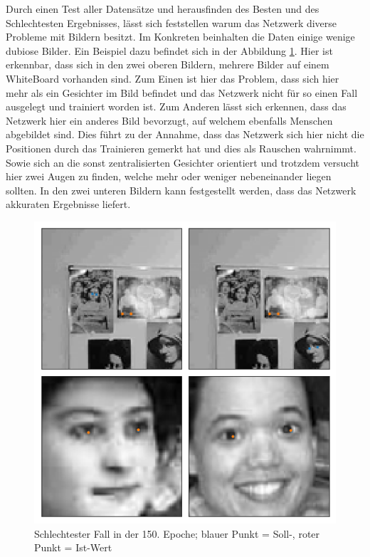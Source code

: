 \noindent
Durch einen Test aller Datensätze und herausfinden des Besten und des Schlechtesten Ergebnisses, lässt sich feststellen warum das Netzwerk diverse Probleme mit Bildern besitzt. 
Im Konkreten beinhalten die Daten einige wenige dubiose Bilder. 
Ein Beispiel dazu befindet sich in der Abbildung \ref{fig:dubio}. 
Hier ist erkennbar, dass sich in den zwei oberen Bildern, mehrere Bilder auf einem WhiteBoard vorhanden sind. 
Zum Einen ist hier das Problem, dass sich hier mehr als ein Gesichter im Bild befindet und das Netzwerk nicht für so einen Fall ausgelegt und trainiert worden ist. 
Zum Anderen lässt sich erkennen, dass das Netzwerk hier ein anderes Bild bevorzugt, auf welchem ebenfalls Menschen abgebildet sind. 
Dies führt zu der Annahme, dass das Netzwerk sich hier nicht die Positionen durch das Trainieren gemerkt hat und dies als Rauschen wahrnimmt. 
Sowie sich an die sonst zentralisierten Gesichter orientiert und trotzdem versucht hier zwei Augen zu finden, welche mehr oder weniger nebeneinander liegen sollten. 
In den zwei unteren Bildern kann festgestellt werden, dass das Netzwerk akkuraten Ergebnisse liefert. 
\begin{figure}[ht!]
	\centering
	\includegraphics[scale=0.6]{images/Bad_2.png}
	\caption{Schlechtester Fall in der 150. Epoche; blauer Punkt = Soll-, roter Punkt = Ist-Wert}
	\label{fig:dubio}
\end{figure} \phantom \newline

